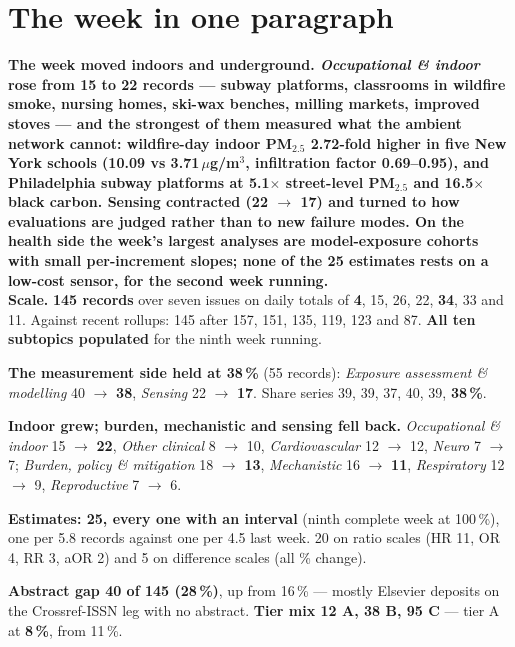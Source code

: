 \documentclass[10pt]{article}
\begin{document}
\vspace{6mm}

\section*{\sffamily\bfseries\color{Deep}The week in one paragraph}
\vspace{-1.5mm}{\color{Teal}\rule{\linewidth}{1.1pt}}\vspace{2.5mm}

\begin{keybox}
{\sffamily\bfseries\small\color{Deep}The week moved indoors and underground. \textit{Occupational \& indoor} rose
from 15 to 22 records --- subway platforms, classrooms in wildfire smoke, nursing homes, ski-wax benches, milling
markets, improved stoves --- and the strongest of them measured what the ambient network cannot: wildfire-day
indoor PM$_{2.5}$ 2.72-fold higher in five New York schools (10.09 vs 3.71\,$\mu$g/m$^3$, infiltration factor
0.69--0.95), and Philadelphia subway platforms at 5.1$\times$ street-level PM$_{2.5}$ and 16.5$\times$ black carbon.
Sensing contracted (22 $\rightarrow$ 17) and turned to how evaluations are judged rather than to new failure modes.
On the health side the week's largest analyses are model-exposure cohorts with small per-increment slopes; none of
the 25 estimates rests on a low-cost sensor, for the second week running.}\\[1.4mm]
\footnotesize
\textbf{Scale.} \textbf{145 records} over seven issues on daily totals of \textbf{4}, 15, 26, 22, \textbf{34}, 33
and 11. Against recent rollups: 145 after 157, 151, 135, 119, 123 and 87. \textbf{All ten subtopics populated}
for the ninth week running.

\textbf{The measurement side held at 38\,\%} (55 records): \textit{Exposure assessment \& modelling} 40
$\rightarrow$ \textbf{38}, \textit{Sensing} 22 $\rightarrow$ \textbf{17}. Share series 39, 39, 37, 40, 39,
\textbf{38\,\%}.

\textbf{Indoor grew; burden, mechanistic and sensing fell back.} \textit{Occupational \& indoor} 15 $\rightarrow$
\textbf{22}, \textit{Other clinical} 8 $\rightarrow$ 10, \textit{Cardiovascular} 12 $\rightarrow$ 12, \textit{Neuro}
7 $\rightarrow$ 7; \textit{Burden, policy \& mitigation} 18 $\rightarrow$ \textbf{13}, \textit{Mechanistic} 16
$\rightarrow$ \textbf{11}, \textit{Respiratory} 12 $\rightarrow$ 9, \textit{Reproductive} 7 $\rightarrow$ 6.

\textbf{Estimates: 25, every one with an interval} (ninth complete week at 100\,\%), one per 5.8 records against
one per 4.5 last week. 20 on ratio scales (HR 11, OR 4, RR 3, aOR 2) and 5 on difference scales (all \% change).

\textbf{Abstract gap 40 of 145 (28\,\%)}, up from 16\,\% --- mostly Elsevier deposits on the Crossref-ISSN leg
with no abstract. \textbf{Tier mix 12 A, 38 B, 95 C} --- tier A at \textbf{8\,\%}, from 11\,\%.
\end{keybox}
\end{document}

